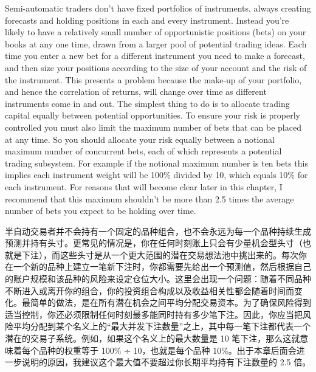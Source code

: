 \begin{englishblock} Semi-automatic traders don't have fixed portfolios of instruments, always creating forecasts and holding positions in each and every instrument. Instead you're likely to have a relatively small number of opportunistic positions (bets) on your books at any one time, drawn from a larger pool of potential trading ideas. Each time you enter a new bet for a different instrument you need to make a forecast, and then size your positions according to the size of your account and the risk of the instrument. This presents a problem because the make-up of your portfolio, and hence the correlation of returns, will change over time as different instruments come in and out. The simplest thing to do is to allocate trading capital equally between potential opportunities. To ensure your risk is properly controlled you must also limit the maximum number of bets that can be placed at any time. So you should allocate your risk equally between a notional maximum number of concurrent bets, each of which represents a potential trading subsystem. For example if the notional maximum number is ten bets this implies each instrument weight will be 100\% divided by 10, which equals 10\% for each instrument. For reasons that will become clear later in this chapter, I recommend that this maximum shouldn't be more than 2.5 times the average number of bets you expect to be holding over time. \end{englishblock}

\begin{chineseblock}半自动交易者并不会持有一个固定的品种组合，也不会永远为每一个品种持续生成预测并持有头寸。更常见的情况是，你在任何时刻账上只会有少量机会型头寸（也就是下注），而这些头寸是从一个更大范围的潜在交易想法池中挑出来的。每次你在一个新的品种上建立一笔新下注时，你都需要先给出一个预测值，然后根据自己的账户规模和该品种的风险来设定仓位大小。这里会出现一个问题：随着不同品种不断进入或离开你的组合，你的投资组合构成以及收益相关性都会随着时间而变化。最简单的做法，是在所有潜在机会之间平均分配交易资本。为了确保风险得到适当控制，你还必须限制任何时刻最多能同时持有多少笔下注。因此，你应当把风险平均分配到某个名义上的“最大并发下注数量”之上，其中每一笔下注都代表一个潜在的交易子系统。例如，如果这个名义上的最大数量是 10 笔下注，那么这就意味着每个品种的权重等于 100\% ÷ 10，也就是每个品种 10\%。出于本章后面会进一步说明的原因，我建议这个最大值不要超过你长期平均持有下注数量的 2.5 倍。\end{chineseblock}


